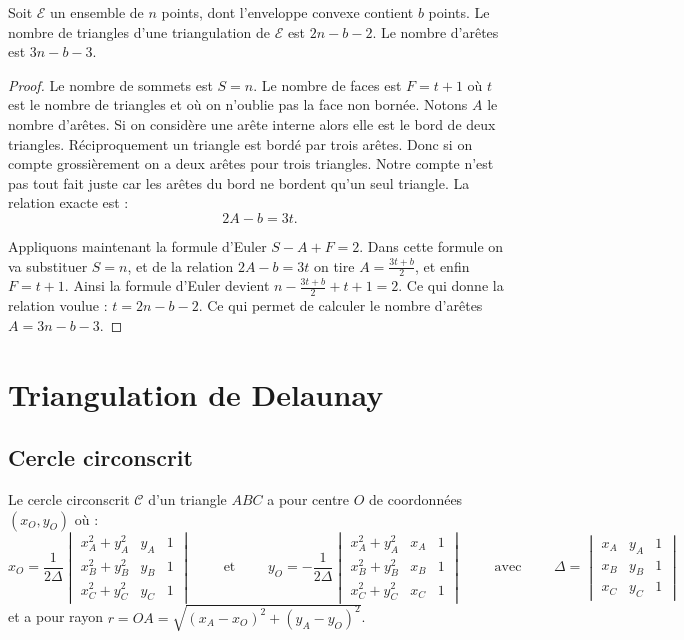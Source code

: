 \documentclass[11pt,class=report,crop=false]{standalone}
\begin{document}
\begin{proposition}
	Soit $\mathcal{E}$ un ensemble de $n$ points, dont l'enveloppe convexe contient $b$ points.
	Le nombre de triangles d'une triangulation de $\mathcal{E}$ est $2n-b-2$.
	Le nombre d'arêtes est $3n-b-3$.
\end{proposition}	

\begin{proof}
Le nombre de sommets est $S = n$.
Le nombre de faces est $F = t+1$ où $t$ est le nombre de triangles et où on n'oublie pas la face non bornée.
Notons $A$ le nombre d'arêtes.
Si on considère une arête interne alors elle est le bord de deux triangles.
Réciproquement un triangle est bordé par trois arêtes. Donc si on compte grossièrement on a deux arêtes pour trois triangles. Notre compte n'est pas tout fait juste car les arêtes du bord ne bordent qu'un seul triangle. La relation exacte est :
$$2A -b = 3t.$$


Appliquons maintenant la formule d'Euler $S-A+F=2$.
Dans cette formule on va substituer $S=n$,
et de la relation $2A-b=3t$ on tire $A=\frac{3t+b}{2}$, et enfin $F=t+1$.
Ainsi la formule d'Euler devient
$n-\frac{3t+b}{2} + t+1 = 2$. Ce qui donne la relation voulue : $t = 2n-b-2$.
Ce qui permet de calculer le nombre d'arêtes $A = 3n-b-3$.
\end{proof}


\section{Triangulation de Delaunay}


\subsection{Cercle circonscrit}

\begin{proposition}

Le cercle circonscrit $\mathcal{C}$ d'un triangle $ABC$ a pour centre
$O$ de coordonnées $(x_O,y_O)$ où :
$$x_O = \frac{1}{2\Delta}\begin{vmatrix}x_A^2+y_A^2 & y_A & 1 \\ x_B^2+y_B^2 & y_B & 1 \\ x_C^2+y_C^2 & y_C & 1 \end{vmatrix}
\qquad \text{ et } \qquad 
y_O = -\frac{1}{2\Delta}\begin{vmatrix}x_A^2+y_A^2 & x_A & 1 \\ x_B^2+y_B^2 & x_B & 1 \\ x_C^2+y_C^2 & x_C & 1 \end{vmatrix}
\qquad \text{ avec } \qquad
\Delta= \begin{vmatrix}x_A & y_A & 1 \\ x_B & y_B & 1 \\ x_C & y_C & 1 \end{vmatrix}
$$
et a pour rayon 
$r = OA = \sqrt{ (x_A-x_O)^2 + (y_A-y_O)^2 }$.
\end{proposition}	
\end{document}

